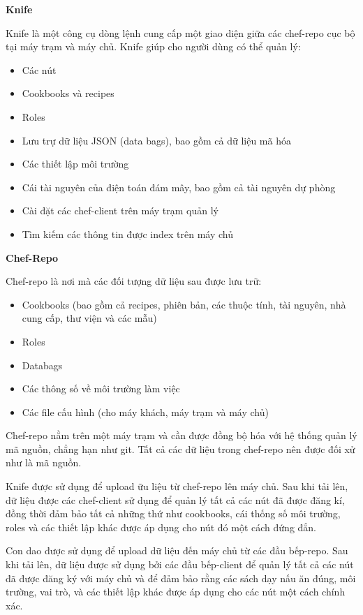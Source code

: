\textbf{\large Knife}


Knife là một công cụ dòng lệnh cung cấp một giao diện giữa các chef-repo cục bộ tại máy trạm và máy chủ. Knife giúp cho người dùng có thể quản lý:

\begin{itemize}
\item Các nút
\item Cookbooks và recipes
\item Roles
\item Lưu trự dữ liệu JSON (data bags), bao gồm cả dữ liệu mã hóa
\item Các thiết lập môi trường
\item Cái tài nguyên của điện toán đám mây, bao gồm cả tài nguyên dự phòng
\item Cài đặt các chef-client trên máy trạm quản lý
\item Tìm kiếm các thông tin được index trên máy chủ
\end{itemize}

\textbf{\large Chef-Repo}


Chef-repo là nơi mà các đối tượng dữ liệu sau được lưu trữ:

\begin{itemize}
\item Cookbooks (bao gồm cả recipes, phiên bản, các thuộc tính, tài nguyên, nhà cung cấp, thư viện và các mẫu)
\item Roles
\item Databags
\item Các thông số về môi trường làm việc
\item Các file cấu hình (cho máy khách, máy trạm và máy chủ)
\end{itemize}

Chef-repo nằm trên một máy trạm và cần được đồng bộ hóa với hệ thống quản lý mã nguồn, chẳng hạn như git. Tất cả các dữ liệu trong chef-repo nên được đối xử như là mã nguồn.

Knife được sử dụng để upload ữu liệu từ chef-repo lên máy chủ. Sau khi tải lên, dữ liệu được các chef-client sử dụng để quản lý tất cả các nút đã được đăng kí, đồng thời đảm bảo tất cả những thứ như cookbooks, cái thống số môi trường, roles và các thiết lập khác được áp dụng cho nút đó một cách đứng đắn.

Con dao được sử dụng để upload dữ liệu đến máy chủ từ các đầu bếp-repo. Sau khi tải lên, dữ liệu được sử dụng bởi các đầu bếp-client để quản lý tất cả các nút đã được đăng ký với máy chủ và để đảm bảo rằng các sách dạy nấu ăn đúng, môi trường, vai trò, và các thiết lập khác được áp dụng cho các nút một cách chính xác.

